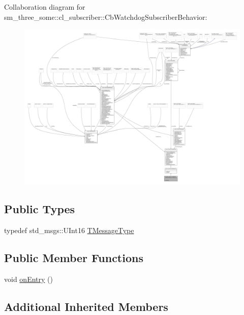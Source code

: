 Collaboration diagram for sm\+\_\+three\+\_\+some\+:\+:cl\+\_\+subscriber\+:\+:Cb\+Watchdog\+Subscriber\+Behavior\+:
\nopagebreak
\begin{figure}[H]
\begin{center}
\leavevmode
\includegraphics[width=350pt]{classsm__three__some_1_1cl__subscriber_1_1CbWatchdogSubscriberBehavior__coll__graph}
\end{center}
\end{figure}
\subsection*{Public Types}
\begin{DoxyCompactItemize}
\item 
typedef std\+\_\+msgs\+::\+U\+Int16 \hyperlink{classsm__three__some_1_1cl__subscriber_1_1CbWatchdogSubscriberBehavior_a2310463e68d0999f13ccc9f16ceaf3fe}{T\+Message\+Type}
\end{DoxyCompactItemize}
\subsection*{Public Member Functions}
\begin{DoxyCompactItemize}
\item 
void \hyperlink{classsm__three__some_1_1cl__subscriber_1_1CbWatchdogSubscriberBehavior_a6bd938abf54a95555182345a5e53cafe}{on\+Entry} ()
\end{DoxyCompactItemize}
\subsection*{Additional Inherited Members}



